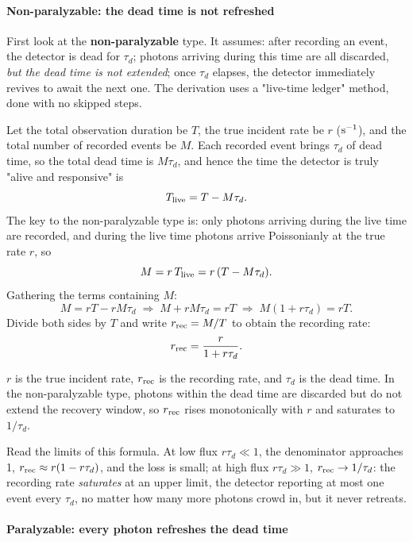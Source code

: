 \paragraph{Non-paralyzable: the dead time is not refreshed}

First look at the \textbf{non-paralyzable} type. It assumes: after recording an event, the detector is dead for $\tau_d$; photons arriving during this time are all discarded, \emph{but the dead time is not extended}; once $\tau_d$ elapses, the detector immediately revives to await the next one. The derivation uses a "live-time ledger" method, done with no skipped steps.

Let the total observation duration be $T$, the true incident rate be $r$ (${\rm s}^{-1}$), and the total number of recorded events be $M$. Each recorded event brings $\tau_d$ of dead time, so the total dead time is $M\tau_d$, and hence the time the detector is truly "alive and responsive" is
\[
  T_{\rm live}=T-M\tau_d .
\]
The key to the non-paralyzable type is: only photons arriving during the live time are recorded, and during the live time photons arrive Poissonianly at the true rate $r$, so
\[
  M=r\,T_{\rm live}=r\,(T-M\tau_d).
\]
Gathering the terms containing $M$:
\[
  M=rT-rM\tau_d \;\Longrightarrow\; M+rM\tau_d=rT \;\Longrightarrow\; M(1+r\tau_d)=rT .
\]
Divide both sides by $T$ and write $r_{\rm rec}=M/T$ to obtain the recording rate:
\begin{equation}
  r_{\rm rec}=\frac{r}{1+r\tau_d}.
  \label{eq:e13-nonparalyzable}
\end{equation}
\begin{formulaexplain}
$r$ is the true incident rate, $r_{\rm rec}$ is the recording rate, and $\tau_d$ is the dead time. In the non-paralyzable type, photons within the dead time are discarded but do not extend the recovery window, so $r_{\rm rec}$ rises monotonically with $r$ and saturates to $1/\tau_d$.
\end{formulaexplain}
Read the limits of this formula. At low flux $r\tau_d\ll1$, the denominator approaches 1, $r_{\rm rec}\approx r(1-r\tau_d)$, and the loss is small; at high flux $r\tau_d\gg1$, $r_{\rm rec}\to 1/\tau_d$: the recording rate \emph{saturates} at an upper limit, the detector reporting at most one event every $\tau_d$, no matter how many more photons crowd in, but it never retreats.

\paragraph{Paralyzable: every photon refreshes the dead time}


